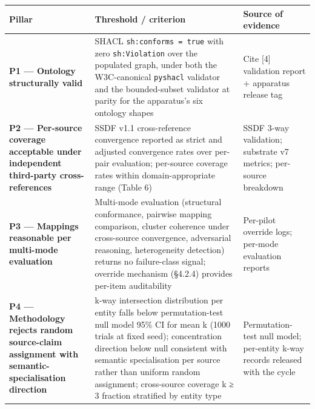 \documentclass[
]{article}
\begin{document}
\begin{longtable}[]{@{}
  >{\raggedright\arraybackslash}p{}
  >{\raggedright\arraybackslash}p{}
  >{\raggedright\arraybackslash}p{}@{}}
\toprule\noalign{}
\begin{minipage}[b]{\linewidth}\raggedright
Pillar
\end{minipage} & \begin{minipage}[b]{\linewidth}\raggedright
Threshold / criterion
\end{minipage} & \begin{minipage}[b]{\linewidth}\raggedright
Source of evidence
\end{minipage} \\
\midrule\noalign{}
\endhead
\bottomrule\noalign{}
\endlastfoot
\textbf{P1 --- Ontology structurally valid} & SHACL
\texttt{sh:conforms\ =\ true} with zero \texttt{sh:Violation} over the
populated graph, under both the W3C-canonical \texttt{pyshacl} validator
and the bounded-subset validator at parity for the apparatus's six
ontology shapes & Cite {[}4{]} validation report + apparatus release
tag \\
\textbf{P2 --- Per-source coverage acceptable under independent
third-party cross-references} & SSDF v1.1 cross-reference convergence
reported as strict and adjusted convergence rates over per-pair
evaluation; per-source coverage rates within domain-appropriate range
(Table 6) & SSDF 3-way validation; substrate v7 metrics; per-source
breakdown \\
\textbf{P3 --- Mappings reasonable per multi-mode evaluation} &
Multi-mode evaluation (structural conformance, pairwise mapping
comparison, cluster coherence under cross-source convergence,
adversarial reasoning, heterogeneity detection) returns no failure-class
signal; override mechanism (§4.2.4) provides per-item auditability &
Per-pilot override logs; per-mode evaluation reports \\
\textbf{P4 --- Methodology rejects random source-claim assignment with
semantic-specialisation direction} & k-way intersection distribution per
entity falls below permutation-test null model 95\% CI for mean k (1000
trials at fixed seed); concentration direction below null consistent
with semantic specialisation per source rather than uniform random
assignment; cross-source coverage k ≥ 3 fraction stratified by entity
type & Permutation-test null model; per-entity k-way records released
with the cycle \\
\end{longtable}
\end{document}
